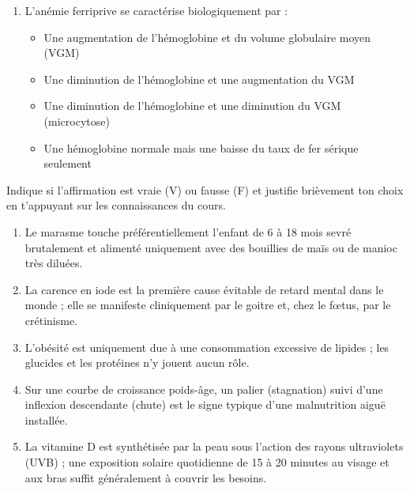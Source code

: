 \documentclass[11pt]{article}
\begin{document}
\begin{exercice}
\begin{enumerate}
\begin{itemize}
    \end{itemize}
    \item L'anémie ferriprive se caractérise biologiquement par :
    \begin{itemize}
        \item[A.] Une augmentation de l'hémoglobine et du volume globulaire moyen (VGM)
        \item[B.] Une diminution de l'hémoglobine et une augmentation du VGM
        \item[C.] Une diminution de l'hémoglobine et une diminution du VGM (microcytose)
        \item[D.] Une hémoglobine normale mais une baisse du taux de fer sérique seulement
    \end{itemize}
\end{enumerate}
\end{exercice}

\begin{exercice}
Indique si l'affirmation est vraie (V) ou fausse (F) et justifie brièvement ton choix en t'appuyant sur les connaissances du cours.
\begin{enumerate}
    \item Le marasme touche préférentiellement l'enfant de 6 à 18 mois sevré brutalement et alimenté uniquement avec des bouillies de maïs ou de manioc très diluées.
    \item La carence en iode est la première cause évitable de retard mental dans le monde ; elle se manifeste cliniquement par le goitre et, chez le fœtus, par le crétinisme.
    \item L'obésité est uniquement due à une consommation excessive de lipides ; les glucides et les protéines n'y jouent aucun rôle.
    \item Sur une courbe de croissance poids-âge, un palier (stagnation) suivi d'une inflexion descendante (chute) est le signe typique d'une malnutrition aiguë installée.
    \item La vitamine D est synthétisée par la peau sous l'action des rayons ultraviolets (UVB) ; une exposition solaire quotidienne de 15 à 20 minutes au visage et aux bras suffit généralement à couvrir les besoins.
\end{enumerate}
\end{exercice}
\end{document}
